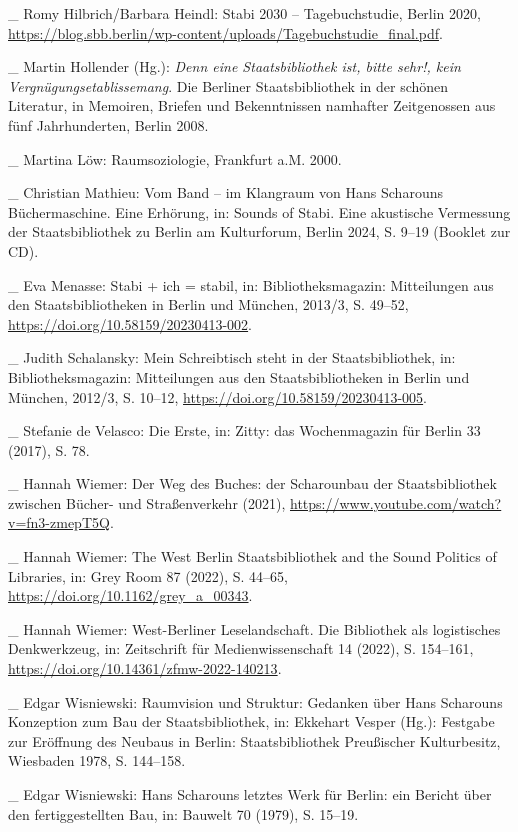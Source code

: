 \documentclass[a4paper,
fontsize=11pt,
oneside,
numbers=noperiodatend,
parskip=half-,
bibliography=totoc,
final
]{scrartcl}
\begin{document}
\_ Romy Hilbrich/Barbara Heindl: Stabi 2030 -- Tagebuchstudie, Berlin
2020,
\url{https://blog.sbb.berlin/wp-content/uploads/Tagebuchstudie_final.pdf}.

\_ Martin Hollender (Hg.): \emph{Denn eine Staatsbibliothek ist, bitte
sehr!, kein Vergnügungsetablissemang}. Die Berliner Staatsbibliothek in
der schönen Literatur, in Memoiren, Briefen und Bekenntnissen namhafter
Zeitgenossen aus fünf Jahrhunderten, Berlin 2008.

\_ Martina Löw: Raumsoziologie, Frankfurt a.M. 2000.

\_ Christian Mathieu: Vom Band -- im Klangraum von Hans Scharouns
Büchermaschine. Eine Erhörung, in: Sounds of Stabi. Eine akustische
Vermessung der Staatsbibliothek zu Berlin am Kulturforum, Berlin 2024,
S. 9--19 (Booklet zur CD).

\_ Eva Menasse: Stabi + ich = stabil, in: Bibliotheksmagazin:
Mitteilungen aus den Staatsbibliotheken in Berlin und München, 2013/3,
S. 49--52, \url{https://doi.org/10.58159/20230413-002}.

\_ Judith Schalansky: Mein Schreibtisch steht in der Staatsbibliothek,
in: Bibliotheksmagazin: Mitteilungen aus den Staatsbibliotheken in
Berlin und München, 2012/3, S. 10--12,
\url{https://doi.org/10.58159/20230413-005}.

\_ Stefanie de Velasco: Die Erste, in: Zitty: das Wochenmagazin für
Berlin 33 (2017), S. 78.

\_ Hannah Wiemer: Der Weg des Buches: der Scharounbau der
Staatsbibliothek zwischen Bücher- und Straßenverkehr (2021),
\url{https://www.youtube.com/watch?v=fn3-zmepT5Q}.

\_ Hannah Wiemer: The West Berlin Staatsbibliothek and the Sound
Politics of Libraries, in: Grey Room 87 (2022), S. 44--65,
\url{https://doi.org/10.1162/grey_a_00343}.

\_ Hannah Wiemer: West-Berliner Leselandschaft. Die Bibliothek als
logistisches Denkwerkzeug, in: Zeitschrift für Medienwissenschaft 14
(2022), S. 154--161, \url{https://doi.org/10.14361/zfmw-2022-140213}.

\_ Edgar Wisniewski: Raumvision und Struktur: Gedanken über Hans
Scharouns Konzeption zum Bau der Staatsbibliothek, in: Ekkehart Vesper
(Hg.): Festgabe zur Eröffnung des Neubaus in Berlin: Staatsbibliothek
Preußischer Kulturbesitz, Wiesbaden 1978, S. 144--158.

\_ Edgar Wisniewski: Hans Scharouns letztes Werk für Berlin: ein Bericht
über den fertiggestellten Bau, in: Bauwelt 70 (1979), S. 15--19.
\end{document}
